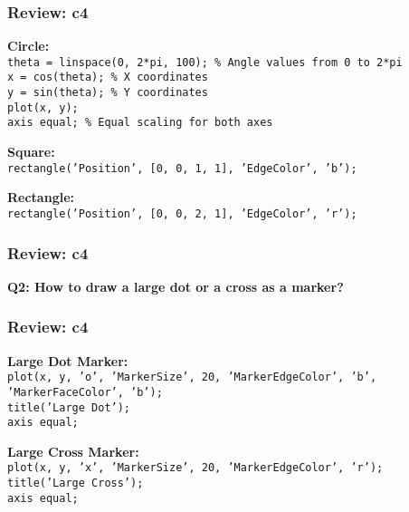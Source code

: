 \documentclass[
	11pt, %
]{beamer}
\begin{document}
\begin{frame}
	\frametitle{Review: c4}

    \textbf{Circle:} \\
    \texttt{theta = linspace(0, 2*pi, 100); \% Angle values from 0 to 2*pi \\}
    \texttt{x = cos(theta); \% X coordinates \\}
    \texttt{y = sin(theta); \% Y coordinates \\}
    \texttt{plot(x, y); \\}
    \texttt{axis equal; \% Equal scaling for both axes \\}

    \vspace{0.5cm}
    
    \textbf{Square:} \\
    \texttt{rectangle('Position', [0, 0, 1, 1], 'EdgeColor', 'b'); \\}

    \vspace{0.5cm}
    
    \textbf{Rectangle:} \\
    \texttt{rectangle('Position', [0, 0, 2, 1], 'EdgeColor', 'r'); \\}
\end{frame}


\begin{frame}
	\frametitle{Review: c4}

	\textbf{Q2: How to draw a large dot or a cross as a marker?}

\end{frame}


\begin{frame}
	\frametitle{Review: c4}

	\textbf{Large Dot Marker:} \\
    \texttt{plot(x, y, 'o', 'MarkerSize', 20, 'MarkerEdgeColor', 'b', 'MarkerFaceColor', 'b');} \\
    \texttt{title('Large Dot');} \\
    \texttt{axis equal;} \\
    
    \vspace{0.5cm}
    
    \textbf{Large Cross Marker:} \\
    \texttt{plot(x, y, 'x', 'MarkerSize', 20, 'MarkerEdgeColor', 'r');} \\
    \texttt{title('Large Cross');} \\
    \texttt{axis equal;}
    
\end{frame}
\end{document}
